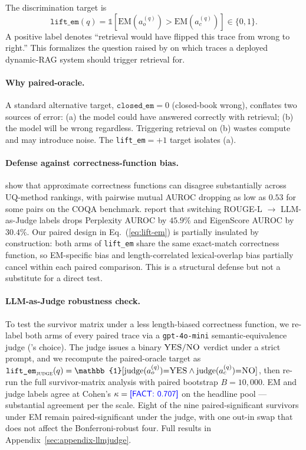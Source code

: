 \documentclass[11pt]{article}
\newcommand{\FACT}[1]{{\color{blue}\textsf{[FACT: #1]}}}
\begin{document}
\noindent The discrimination target is
\begin{equation}
\texttt{lift\_em}(q) = \mathbb{1}\!\left[\mathrm{EM}(a_o^{(q)}) > \mathrm{EM}(a_c^{(q)})\right]
\in \{0, 1\}.
\label{eq:lift-em}
\end{equation}
\noindent A positive label denotes ``retrieval would have flipped this trace
from wrong to right.'' This formalizes the question raised by
\cite{Mallen_WhenNotToTrustLMs} on which traces a deployed dynamic-RAG system
should trigger retrieval for.

\paragraph{Why paired-oracle.} A standard alternative target,
$\texttt{closed\_em} = 0$ (closed-book wrong), conflates two sources of error:
(a) the model could have answered correctly with retrieval; (b) the model
will be wrong regardless. Triggering retrieval on (b) wastes compute and may
introduce noise. The \texttt{lift\_em}$=+1$ target isolates (a).

\paragraph{Defense against correctness-function bias.}
\cite{Ielanskyi_PitfallsUQEvaluationNLG} show that approximate correctness
functions can disagree substantially across UQ-method rankings, with
pairwise mutual AUROC dropping as low as $0.53$ for some pairs on the
COQA benchmark.
\cite{Janiak_IllusionProgressHallucinationDetection} report that switching
ROUGE-L $\to$ LLM-as-Judge labels drops Perplexity AUROC by $45.9\%$ and
EigenScore AUROC by $30.4\%$. Our paired design in
Eq.~(\ref{eq:lift-em}) is partially insulated by construction: both arms
of \texttt{lift\_em} share the same exact-match correctness function, so
EM-specific bias and length-correlated lexical-overlap bias partially
cancel within each paired comparison. This is a structural defense but
not a substitute for a direct test.

\paragraph{LLM-as-Judge robustness check.} To test the survivor matrix
under a less length-biased correctness function, we re-label both arms
of every paired trace via a \texttt{gpt-4o-mini} semantic-equivalence
judge (\citealp{Janiak_IllusionProgressHallucinationDetection}'s choice).
The judge issues a binary $\textsc{YES}/\textsc{NO}$ verdict under a
strict prompt, and we recompute the paired-oracle target as
$\texttt{lift\_em}_{\textsc{judge}}(q) =
\mathbb{1}[\mathrm{judge}(a_o^{(q)}){=}\textsc{YES} \wedge
\mathrm{judge}(a_c^{(q)}){=}\textsc{NO}]$, then re-run the full
survivor-matrix analysis with paired bootstrap $B{=}10{,}000$. EM and
judge labels agree at Cohen's $\kappa = \FACT{0.707}$ on the headline
pool — substantial agreement per the \citet{LandisKoch_Kappa} scale.
Eight of the nine paired-significant survivors under EM remain
paired-significant under the judge, with one out-in swap that does not
affect the Bonferroni-robust four. Full results in
Appendix~\ref{sec:appendix-llmjudge}.
\end{document}
